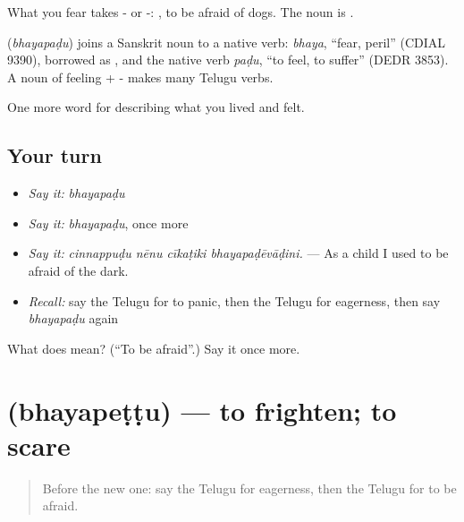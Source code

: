 What you fear takes - or -:  , to be afraid of dogs. The noun is .

\begin{cousinweb}
\textbf{} (\emph{bhayapaḍu}) joins a Sanskrit noun to a native verb: \emph{bhaya}, \textquotedblleft{}fear, peril\textquotedblright{} (CDIAL 9390), borrowed as , and the native verb \emph{paḍu}, \textquotedblleft{}to feel, to suffer\textquotedblright{} (DEDR 3853). A noun of feeling + - makes many Telugu verbs.
\end{cousinweb}

\begin{grammarlens}[title={What you've built}]
One more word for describing what you lived and felt.
\end{grammarlens}

\subsection*{Your turn}
\begin{itemize}
\raggedright
  \item \emph{Say it:} \emph{bhayapaḍu}
  \item \emph{Say it:} \emph{bhayapaḍu}, once more
  \item \emph{Say it:} \emph{cinnappuḍu nēnu cīkaṭiki bhayapaḍēvāḍini.} — As a child I used to be afraid of the dark.
  \item \emph{Recall:} say the Telugu for to panic, then the Telugu for eagerness, then say \emph{bhayapaḍu} again
\end{itemize}

\begin{tcolorbox}[breakable,colback=teal!4,colframe=teal!35!black,title={Before you move on}]
What does  mean? (\textquotedblleft{}To be afraid\textquotedblright{}.) Say it once more.
\end{tcolorbox}
\section[\texorpdfstring{\te{భయపెట్టు} (bhayapeṭṭu)}{భయపెట్టు (bhayapeṭṭu)}]{ (bhayapeṭṭu) — to frighten; to scare}

\label{lesson:TE-C495-bhayapettu}



\begin{quote}
Before the new one: say the Telugu for eagerness, then the Telugu for to be afraid.
\end{quote}

